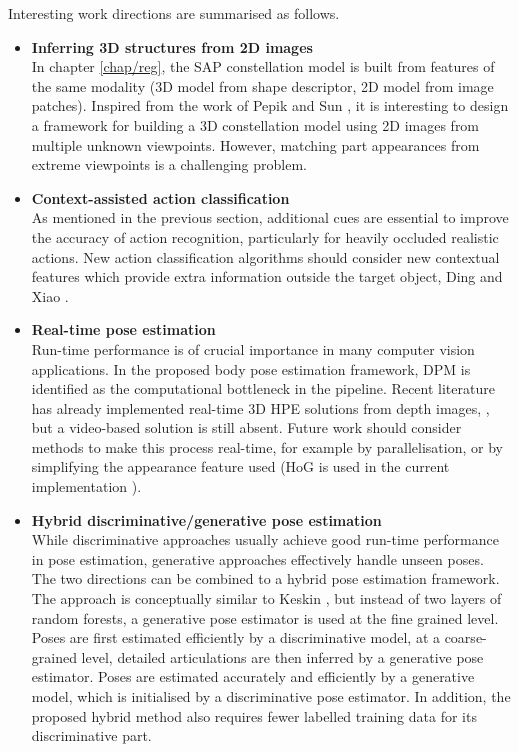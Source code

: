 \iffalse
Interesting work directions are summarised as follows.
\begin{itemize}
	\item \textbf{Inferring 3D structures from 2D images} \\  
	In chapter \ref{chap/reg}, the SAP constellation model is built from features of the same modality (3D model from shape descriptor, 2D model from image patches). Inspired from the work of Pepik \etal \cite{Pepik2012} and Sun \etal \cite{Sun2009}, it is interesting to design a framework for building a 3D constellation model using 2D images from multiple unknown viewpoints. However, matching part appearances from extreme viewpoints is a challenging problem.  
	\item \textbf{Context-assisted action classification} \\ 
	As mentioned in the previous section, additional cues are essential to improve the accuracy of action recognition, particularly for heavily occluded realistic actions. New action classification algorithms should consider new contextual features which provide extra information outside the target object, \eg Ding and Xiao \cite{Ding2012}.   
	\item \textbf{Real-time pose estimation}\\ 
	Run-time performance is of crucial importance in many computer vision applications. In the proposed body pose estimation framework, DPM is identified as the computational bottleneck in the pipeline. 
	Recent literature has already implemented real-time 3D HPE solutions from depth images, \eg \cite{Baak2011, Girshick2011, Sun2012}, but a video-based solution is still absent.  
	Future work should consider methods to make this process real-time, for example by parallelisation, or by simplifying the appearance feature used (HoG is used in the current implementation \cite{Yang2011}).  
	\item \textbf{Hybrid discriminative/generative pose estimation}\\
	While discriminative approaches usually achieve good run-time performance in pose estimation, generative approaches effectively handle unseen poses. The two directions can be combined to a hybrid pose estimation framework. The approach is conceptually similar to Keskin \etal \cite{Keskin2012}, but instead of two layers of random forests, a generative pose estimator is used at the fine grained level. Poses are first estimated efficiently by a discriminative model, at a coarse-grained level, detailed articulations are then inferred by a generative pose estimator. Poses are estimated accurately and efficiently by a generative model, which is initialised by a discriminative pose estimator. In addition, the proposed hybrid method also requires fewer labelled training data for its discriminative part. 

\end{itemize}

